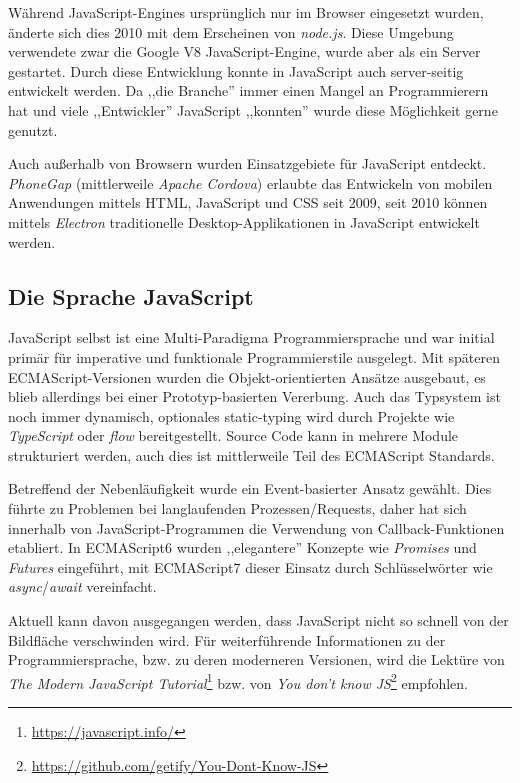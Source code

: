 Während JavaScript-Engines ursprünglich nur im Browser eingesetzt wurden, änderte sich dies 2010 mit dem Erscheinen von \textit{node.js}. Diese Umgebung verwendete zwar die Google V8 JavaScript-Engine, wurde aber als ein Server gestartet. Durch diese Entwicklung konnte in JavaScript auch server-seitig entwickelt werden. Da ,,die Branche'' immer einen Mangel an Programmierern hat und viele ,,Entwickler'' JavaScript ,,konnten'' wurde diese Möglichkeit gerne genutzt.

Auch außerhalb von Browsern wurden Einsatzgebiete für JavaScript entdeckt. \textit{PhoneGap} (mittlerweile \textit{Apache Cordova}) erlaubte das Entwickeln von mobilen Anwendungen mittels HTML, JavaScript und CSS seit 2009, seit 2010 können mittels \textit{Electron} traditionelle Desktop-Applikationen in JavaScript entwickelt werden.

\subsection{Die Sprache JavaScript}

JavaScript selbst ist eine Multi-Paradigma Programmiersprache und war initial primär für imperative und funktionale Programmierstile ausgelegt. Mit späteren ECMAScript-Versionen wurden die Objekt-orientierten Ansätze ausgebaut, es blieb allerdings bei einer Prototyp-basierten Vererbung. Auch das Typsystem ist noch immer dynamisch, optionales static-typing wird durch Projekte wie \textit{TypeScript} oder \textit{flow} bereitgestellt. Source Code kann in mehrere Module strukturiert werden, auch dies ist mittlerweile Teil des ECMAScript Standards.

Betreffend der Nebenläufigkeit wurde ein Event-basierter Ansatz gewählt. Dies führte zu Problemen bei langlaufenden Prozessen/Requests, daher hat sich innerhalb von JavaScript-Programmen die Verwendung von Callback-Funktionen etabliert. In ECMAScript6 wurden ,,elegantere'' Konzepte wie \textit{Promises} und \textit{Futures} eingeführt, mit ECMAScript7 dieser Einsatz durch Schlüsselwörter wie \textit{async}/\textit{await} vereinfacht.

Aktuell kann davon ausgegangen werden, dass JavaScript nicht so schnell von der Bildfläche verschwinden wird. Für weiterführende Informationen zu der Programmiersprache, bzw. zu deren moderneren Versionen, wird die Lektüre von \textit{The Modern JavaScript Tutorial}\footnote{\url{https://javascript.info/}} bzw. von \textit{You don't know JS}\footnote{\url{https://github.com/getify/You-Dont-Know-JS}} empfohlen.

